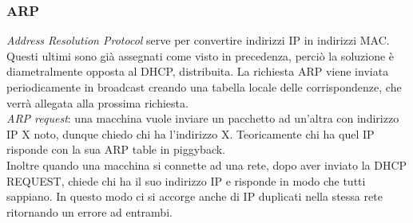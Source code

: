 \documentclass[10pt,a4paper,twoside]{article}
\begin{document}
\subsubsection{ARP}
\textit{Address Resolution Protocol} serve per convertire indirizzi IP in indirizzi MAC. Questi ultimi sono già assegnati come visto in precedenza, perciò la soluzione è diametralmente opposta al DHCP, distribuita. La richiesta ARP viene inviata periodicamente in broadcast creando una tabella locale delle corrispondenze, che verrà allegata alla prossima richiesta.\\
\textit{ARP request}: una macchina vuole inviare un pacchetto ad un'altra con indirizzo IP X noto, dunque chiedo chi ha l'indirizzo X. Teoricamente chi ha quel IP risponde con la sua ARP table in piggyback.\\
Inoltre quando una macchina si connette ad una rete, dopo aver inviato la DHCP REQUEST, chiede chi ha il suo indirizzo IP e risponde in modo che tutti sappiano. In questo modo ci si accorge anche di IP duplicati nella stessa rete ritornando un errore ad entrambi.
\end{document}
